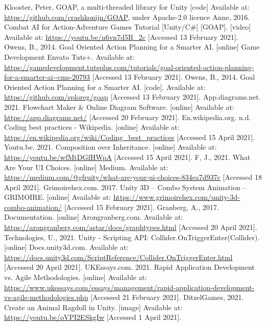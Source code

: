 \documentclass[11pt]{report}
\begin{document}
\begin{thebibliography}{}
    Klooster, Peter, GOAP, a multi-threaded library for Unity [code] Available at: \url{https://github.com/crashkonijn/GOAP}, under Apache-2.0 licence
    Anne, 2016. Combat AI for Action-Adventure Games Tutorial [Unity/C\#] [GOAP]. [video] Available at: \url{https://youtu.be/n6vn7d5R_2c} [Accessed 13 February 2021].
    Owens, B., 2014. Goal Oriented Action Planning for a Smarter AI. [online] Game Development Envato Tuts+. Available at: \url{https://gamedevelopment.tutsplus.com/tutorials/goal-oriented-action-planning-for-a-smarter-ai--cms-20793} [Accessed 13 February 2021].
    Owens, B., 2014. Goal Oriented Action Planning for a Smarter AI. [code]. Available at: \url{https://github.com/sploreg/goap} [Accessed 13 February 2021].
    App.diagrams.net. 2021. Flowchart Maker \& Online Diagram Software. [online] Available at: \url{https://app.diagrams.net/} [Accessed 20 February 2021].
    En.wikipedia.org. n.d. Coding best practices - Wikipedia. [online] Available at: \url{https://en.wikipedia.org/wiki/Coding_best_practices} [Accessed 15 April 2021].
    Youtu.be. 2021. Composition over Inheritance. [online] Available at: \url{https://youtu.be/wfMtDGfHWpA} [Accessed 15 April 2021].
    F, J., 2021. What Are Your UI Choices. [online] Medium. Available at: \url{https://medium.com/@gfruity/what-are-your-ui-choices-834ea7d937c} [Accessed 18 April 2021].
    Grimoirehex.com. 2017. Unity 3D – Combo System Animation – GRIMOIRE. [online] Available at: \url{https://www.grimoirehex.com/unity-3d-combo-animation/} [Accessed 15 February 2021].
    Granberg, A., 2017. Documentation. [online] Arongranberg.com. Available at: \url{https://arongranberg.com/astar/docs/graphtypes.html} [Accessed 20 April 2021].
    Technologies, U., 2021. Unity - Scripting API: Collider.OnTriggerEnter(Collider). [online] Docs.unity3d.com. Available at: \url{https://docs.unity3d.com/ScriptReference/Collider.OnTriggerEnter.html} [Accessed 20 April 2021].
    UKEssays.com. 2021. Rapid Application Development vs. Agile Methodologies. [online] Available at: \url{https://www.ukessays.com/essays/management/rapid-application-development-vs-agile-methodologies.php} [Accessed 21 February 2021].
    DitzelGames, 2021. Create an Animal Ragdoll in Unity. [image] Available at: \url{https://youtu.be/oVPI2ESkgIw} [Accessed 1 April 2021].

\end{thebibliography}
\end{document}

